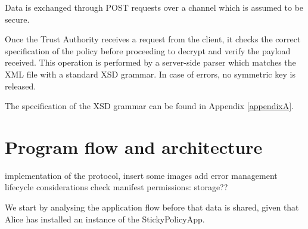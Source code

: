 Data is exchanged through POST requests over a channel which is assumed to be secure.

Once the Trust Authority receives a request from the client, it checks the correct specification of the policy before proceeding to decrypt and verify the payload received. This operation is performed by a server-side parser which matches the XML file with a standard XSD grammar. In case of errors, no symmetric key is released.

The specification of the XSD grammar can be found in Appendix \ref{appendixA}. 

\section{Program flow and architecture}
implementation of the protocol, insert some images
add error management
lifecycle considerations
check manifest permissions: storage??

We start by analysing the application flow before that data is shared, given that Alice has installed an instance of the StickyPolicyApp.

